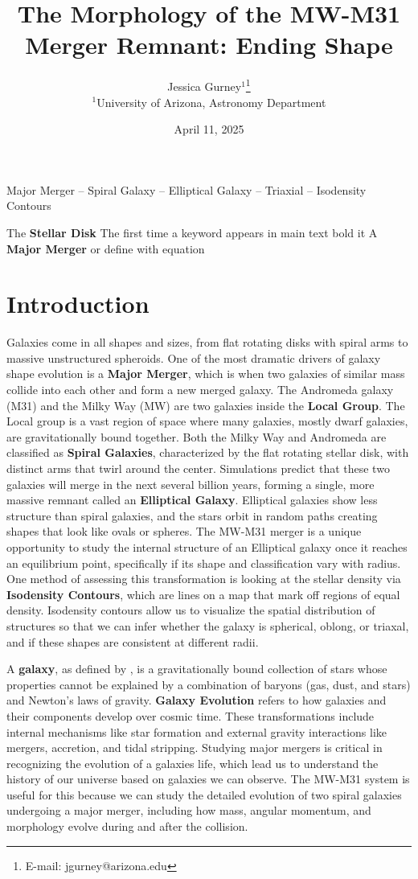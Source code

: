 \documentclass[usenatbib]{mnras}
\title[Shape of Merger Remnant]{The Morphology of the MW-M31 Merger Remnant: Ending Shape}
\author[Jessica Gurney]{
Jessica Gurney$^{1}$\thanks{E-mail: jgurney@arizona.edu}
\\
$^{1}$University of Arizona, Astronomy Department\\
}
\date{April 11, 2025}
\begin{document}
\maketitle

\begin{keywords}
Major Merger -- Spiral Galaxy -- Elliptical Galaxy -- Triaxial -- Isodensity Contours
\end{keywords}


The \textbf{Stellar Disk} The first time a keyword appears in main text bold it
A \textbf{Major Merger} or define with equation

\section{Introduction}
Galaxies come in all shapes and sizes, from flat rotating disks with spiral arms to massive unstructured spheroids. One of the most dramatic drivers of galaxy shape evolution is a \textbf{Major Merger}, which is when two galaxies of similar mass collide into each other and form a new merged galaxy. The Andromeda galaxy (M31) and the Milky Way (MW) are two galaxies inside the \textbf{Local Group}. The Local group is a vast region of space where many galaxies, mostly dwarf galaxies, are gravitationally bound together. Both the Milky Way and Andromeda are classified as \textbf{Spiral Galaxies}, characterized by the flat rotating stellar disk, with distinct arms that twirl around the center. Simulations predict that these two galaxies will merge in the next several billion years, forming a single, more massive remnant called an \textbf{Elliptical Galaxy}. Elliptical galaxies show less structure than spiral galaxies, and the stars orbit in random paths creating shapes that look like ovals or spheres. The MW-M31 merger is a unique opportunity to study the internal structure of an Elliptical galaxy once it reaches an equilibrium point, specifically if its shape and classification vary with radius. One method of assessing this transformation is looking at the stellar density via \textbf{Isodensity Contours}, which are lines on a map that mark off regions of equal density. Isodensity contours allow us to visualize the spatial distribution of structures so that we can infer whether the galaxy is spherical, oblong, or triaxal, and if these shapes are consistent at different radii. 

A \textbf{galaxy}, as defined by \cite{willman2012}, is a gravitationally bound collection of stars whose properties cannot be explained by a combination of baryons (gas, dust, and stars) and Newton’s laws of gravity. \textbf{Galaxy Evolution} refers to how galaxies and their components develop over cosmic time. These transformations include internal mechanisms like star formation and external gravity interactions like mergers, accretion, and tidal stripping. Studying major mergers is critical in recognizing the evolution of a galaxies life, which lead us to understand the history of our universe based on galaxies we can observe. The MW-M31 system is useful for this because we can study the detailed evolution of two spiral galaxies undergoing a major merger, including how mass, angular momentum, and morphology evolve during and after the collision. 
\end{document}
